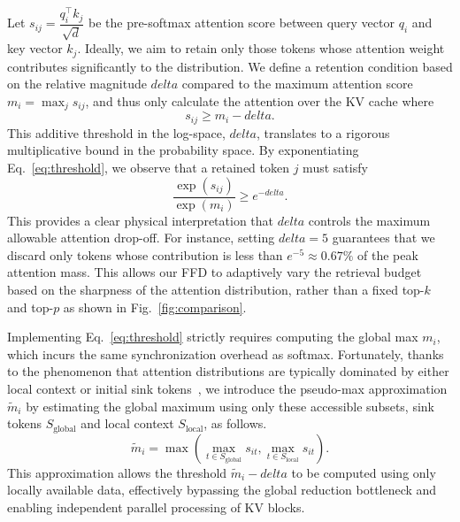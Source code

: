 \documentclass[]{mosi}
\def\bm#1{#1}%
\def\delta{delta}%
\theoremstyle{plain}
\theoremstyle{definition}
\theoremstyle{remark}
\begin{document}
Let $s_{ij} = \dfrac{\bm{q}_i^\top\bm{k}_j}{\sqrt{d}}$ be the pre-softmax attention score between query vector $\bm{q}_i$ and key vector $\bm{k}_j$. Ideally, we aim to retain only those tokens whose attention weight contributes significantly to the distribution. We define a retention condition based on the relative magnitude $\delta$ compared to the maximum attention score $m_i = \max_j s_{ij}$, and thus only calculate the attention over the KV cache where
\begin{equation}
\label{eq:threshold}
s_{ij} \ge m_i - \delta.
\end{equation}
This additive threshold in the log-space, $\delta$, translates to a rigorous multiplicative bound in the probability space. By exponentiating Eq.~\ref{eq:threshold}, we observe that a retained token $j$ must satisfy
\begin{equation}
\frac{\exp(s_{ij})}{\exp(m_i)} \ge e^{-\delta}.
\end{equation}
This provides a clear physical interpretation that $\delta$ controls the maximum allowable attention drop-off. For instance, setting $\delta=5$ guarantees that we discard only tokens whose contribution is less than $e^{-5} \approx 0.67\%$ of the peak attention mass. This allows our FFD to adaptively vary the retrieval budget based on the sharpness of the attention distribution, rather than a fixed top-$k$ and top-$p$ as shown in Fig.~\ref{fig:comparison}.

Implementing Eq.~\ref{eq:threshold} strictly requires computing the global max $m_i$, which incurs the same synchronization overhead as softmax. Fortunately, thanks to the phenomenon that attention distributions are typically dominated by either local context or initial sink tokens~\citep{xiao2023efficient}, we introduce the pseudo-max approximation $\tilde{m}_i$ by estimating the global maximum using only these accessible subsets, sink tokens $S_\text{global}$ and local context $S_\text{local}$, as follows.
\begin{equation}
\tilde{m}_i = \max{\left( \max_{t \in S_\text{global}} s_{it}, \max_{t \in S_\text{local}} s_{it} \right)}.
\end{equation}
This approximation allows the threshold $\tilde{m}_i - \delta$ to be computed using only locally available data, effectively bypassing the global reduction bottleneck and enabling independent parallel processing of KV blocks.
\end{document}

